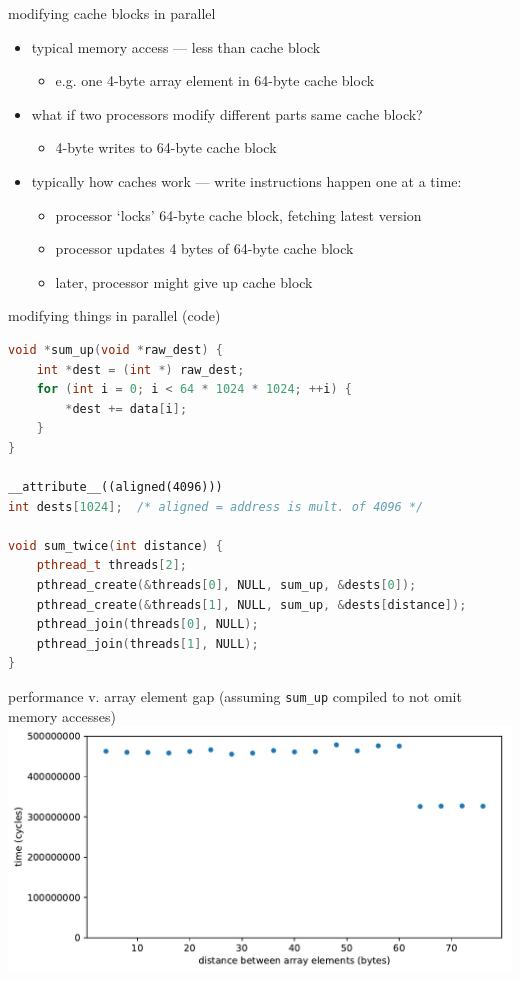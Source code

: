 \begin{frame}{modifying cache blocks in parallel}
\begin{itemize}
\item typical memory access --- less than cache block
    \begin{itemize}
    \item e.g. one 4-byte array element in 64-byte cache block
    \end{itemize}
\vspace{.5cm}
\item what if two processors modify different parts same cache block?   
    \begin{itemize}
    \item 4-byte writes to 64-byte cache block
    \end{itemize}
\item typically how caches work --- write instructions happen one at a time:
    \begin{itemize}
    \item processor `locks' 64-byte cache block, fetching latest version
    \item processor updates 4 bytes of 64-byte cache block
    \item later, processor might give up cache block
    \end{itemize}
\end{itemize}
\end{frame}

\begin{frame}[fragile,label=paralleModCode]{modifying things in parallel (code)}
\begin{lstlisting}[language=C++,style=smaller]
void *sum_up(void *raw_dest) {
    int *dest = (int *) raw_dest;
    for (int i = 0; i < 64 * 1024 * 1024; ++i) {
        *dest += data[i];
    }
}

__attribute__((aligned(4096))) 
int dests[1024];  /* aligned = address is mult. of 4096 */

void sum_twice(int distance) {
    pthread_t threads[2];
    pthread_create(&threads[0], NULL, sum_up, &dests[0]);
    pthread_create(&threads[1], NULL, sum_up, &dests[distance]);
    pthread_join(threads[0], NULL);
    pthread_join(threads[1], NULL);
}
\end{lstlisting}
\end{frame}

\begin{frame}{performance v. array element gap}
(assuming \texttt{sum\_up} compiled to not omit memory accesses)
\includegraphics[width=\textwidth]{../sync/sum-up}
\end{frame}

